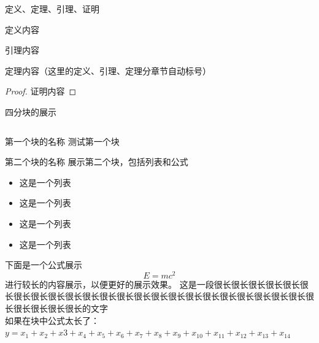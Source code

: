 \documentclass[aspectratio=169]{beamer}
\begin{document}
\begin{frame}{定义、定理、引理、证明}
    \begin{define}[定义名称]
        定义内容
    \end{define}
    \begin{lem}[引理名称]
        引理内容
    \end{lem}
    \begin{thm}[定理名称]
        定理内容（这里的定义、引理、定理分章节自动标号）
    \end{thm}
    \begin{proof}
        证明内容
    \end{proof}
\end{frame}

\begin{frame}{四分块的展示}
    \vspace{-1.8em}
    \tiny
    \begin{columns}[t]  %
        \begin{column}{0.5\textwidth}
            \begin{block}{\scriptsize 第一个块的名称}
                测试第一个块
            \end{block}
            \begin{block}{\scriptsize 第二个块的名称}
                展示第二个块，包括列表和公式
                \begin{itemize}
                    \item 这是一个列表
                    \item 这是一个列表
                    \item 这是一个列表
                    \item 这是一个列表
                \end{itemize}
                下面是一个公式展示
                \begin{equation}
                    \label{eq:2}
                    E=mc^2
                \end{equation}
                进行较长的内容展示，以便更好的展示效果。
                这是一段很长很长很长很长很长很长很长很长很长很长很长很长很长很长很长很长很长很长很长很长很长很长很长很长很长很长很长很长的文字\\
                如果在块中公式太长了：\\
                $y=x_1+x_2+x3+x_4+x_5+x_6+x_7+x_8+x_9+x_{10}+x_{11}+x_{12}+x_{13}+x_{14}$
                \vspace{-1.5em}
                \begin{center}

\end{center}
\end{block}
\end{column}
\end{columns}
\end{frame}
\end{document}
